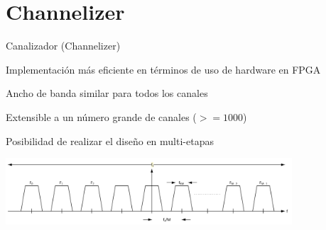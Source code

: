 \documentclass[ignorenonframetext,12pt]{beamer}
\begin{document}
\section{Channelizer}
\begin{frame}{Canalizador (Channelizer)}

				Implementación m\'as eficiente en t\'erminos de uso de hardware en FPGA

				Ancho de banda similar para todos los canales 

				Extensible a un n\'umero grande de canales ($>=1000$)

				Posibilidad de realizar el diseño en multi-etapas

				\begin{center}
								\includegraphics[width=0.8\textwidth]{FDM_channel_diagram}
				\end{center}
\end{frame}
\end{document}
